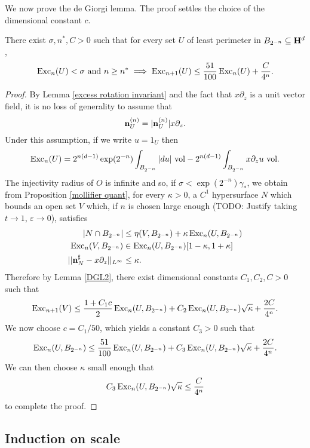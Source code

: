 We now prove the de Giorgi lemma.
The proof settles the choice of the dimensional constant $c$.

\begin{proposition}
There exist $\sigma, n^*, C > 0$ such that for every set $U$ of least perimeter in $B_{2^{-n}} \subseteq \mathbf H^d$,
$$\operatorname{Exc}_n(U) < \sigma \text{ and } n \geq n^* \implies \operatorname{Exc}_{n+1}(U) \leq \frac{51}{100} \operatorname{Exc}_n(U) + \frac{C}{4^n}.$$
\end{proposition}
\begin{proof}
By Lemma \ref{excess rotation invariant} and the fact that $x\partial_z$ is a unit vector field, it is no loss of generality to assume that
$$\mathbf n^{(n)}_U = |\mathbf n^{(n)}_U| x\partial_z.$$
Under this assumption, if we write $u = 1_U$ then
$$\operatorname{Exc}_n(U) = 2^{n(d - 1)} \exp(2^{-n}) \int_{B_{2^{-n}}} |du| ~\mathrm{vol} - 2^{n(d - 1)} \int_{B_{2^{-n}}} x\partial_z u ~\mathrm{vol}.$$
The injectivity radius of $O$ is infinite and so, if $\sigma < \exp(2^{-n}) \gamma_*$, we obtain from Proposition \ref{mollifier quant}, for every $\kappa > 0$, a $C^1$ hypersurface $N$ which bounds an open set $V$ which, if $n$ is chosen large enough (TODO: Justify taking $t \to 1$, $\varepsilon \to 0$), satisfies
\begin{align*}
|N \cap B_{2^{-n}}| &\leq \eta(V, B_{2^{-n}}) + \kappa \operatorname{Exc}_n(U, B_{2^{-n}}) \\
\operatorname{Exc}_n(V, B_{2^{-n}}) &\in \operatorname{Exc}_n(U, B_{2^{-n}})[1 - \kappa, 1 + \kappa] \\
||\mathbf n^\sharp_N - x\partial_z||_{L^\infty} &\leq \kappa.
\end{align*}
Therefore by Lemma \ref{DGL2}, there exist dimensional constants $C_1,C_2,C > 0$ such that
$$\operatorname{Exc}_{n + 1}(V) \leq \frac{1 + C_1c}{2} \operatorname{Exc}_n(U, B_{2^{-n}}) + C_2 \operatorname{Exc}_n(U, B_{2^{-n}}) \sqrt \kappa + \frac{2C}{4^n}.$$
We now choose $c = C_1/50$, which yields a constant $C_3 > 0$ such that
$$\operatorname{Exc}_n(U, B_{2^{-n}}) \leq \frac{51}{100} \operatorname{Exc}_n(U, B_{2^{-n}}) + C_3 \operatorname{Exc}_n(U, B_{2^{-n}}) \sqrt \kappa + \frac{2C}{4^n}.$$
We can then choose $\kappa$ small enough that
$$C_3 \operatorname{Exc}_n(U, B_{2^{-n}}) \sqrt \kappa \leq \frac{C}{4^n}$$
to complete the proof.
\end{proof}


\subsection{Induction on scale}


